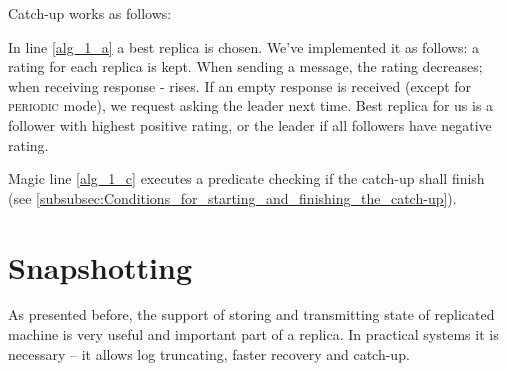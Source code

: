 Catch-up works as follows:

%  
%  
%
%  
%

\vspace{1em}

In line \ref{alg_1_a} a best replica is chosen. We've implemented it as follows: a rating for each replica is kept. When sending a message, the rating decreases; when receiving response - rises. If an empty response is received (except for \textsc{periodic} mode), we request asking the leader next time. Best replica for us is a follower with highest positive rating, or the leader if all followers have negative rating.

Magic line \ref{alg_1_c} executes a predicate checking if the catch-up shall finish (see \ref{subsubsec:Conditions_for_starting_and_finishing_the_catch-up}).

\section{Snapshotting}
\label{sec:snapshotting}
As presented before, the support of storing and transmitting state of replicated machine is very useful and important part of a replica. In practical systems it is necessary -- it allows log truncating, faster recovery and catch-up.

